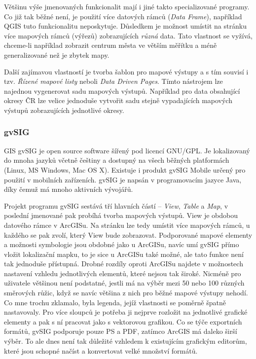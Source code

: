 \documentclass[a4paper,12pt,draft]{article}
\begin{document}
Většinu výše jmenovaných funkcionalit mají i jiné takto
specializované programy. Co již tak běžné není, je použití více
datových rámců (\emph{Data Frame}), například QGIS tuto funkcionalitu
neposkytuje. Důsledkem je možnost umístit na stránku více mapových
rámců (výřezů) zobrazujících \emph{různá} data. Tato vlastnost
se vyžívá, chceme-li například zobrazit centrum města ve větším
měřítku a méně generalizované než je zbytek mapy.

Další zajímavou vlastností je tvorba šablon pro mapové výstupy a
s tím souvisí i tzv. \emph{Řízené mapové listy} neboli \emph{Data
Driven Pages}. Tímto nástrojem lze najednou vygenerovat sadu mapových
výstupů. Například pro data obsahující okresy ČR lze velice jednoduše
vytvořit sadu stejně vypadajících mapových výstupů zobrazujících
jednotlivé okresy.


\subsubsection{gvSIG}
GIS gvSIG je open source software šířený pod licencí GNU/GPL. Je
lokalizovaný do mnoha jazyků včetně češtiny a dostupný na všech
běžných platformách (Linux, MS Windows, Mac OS X). Existuje i produkt gvSIG
Mobile určený pro použití v mobilních zařízeních. gvSIG je napsán
v programovacím jazyce Java, díky čemuž má mnoho aktivních vývojářů.

Projekt programu gvSIG sestává tří hlavních částí -- \emph{View},
\emph{Table} a \emph{Map}, v poslední jmenované pak probíhá tvorba
mapových výstupů. View je obdobou datového rámce v ArcGISu. Na stránku
lze tedy umístit více mapových rámců, u každého se pak zvolí,
který View bude zobrazovat. Podporované mapové elementy a možnosti
symbologie jsou obdobné
jako u ArcGISu, navíc umí gvSIG přímo vložit lokalizační mapku,
to je sice u ArcGISu také možné, ale tato funkce není tak jednoduše
přístupná. Drobné rozdíly oproti ArcGISu najdete v možnostech nastavení
vzhledu
jednotlivých elementů, které nejsou tak široké. Nicméně pro uživatele
většinou
není podstatné, jestli má na výběr mezi 50 nebo 100 různých směrových
růžic,
když se navíc  většina z nich  pro běžné mapové výstupy nehodí.
Co mne trochu zklamalo,
byla legenda, jejíž vlastnosti se poměrně špatně nastavovaly. Pro
více sloupců je potřeba ji nejprve rozložit na jednotlivé grafické
elementy a pak s ní pracovat jako s vektorovou grafikou. Co se týče
exportních formátů, gvSIG podporuje pouze PS a PDF, zatímco ArcGIS
má daleko širší výběr. To ale dnes není tak důležité vzhledem
k existujícím grafickým editorům, které jsou schopné načíst a
konvertovat velké množství formátů.
\end{document}
